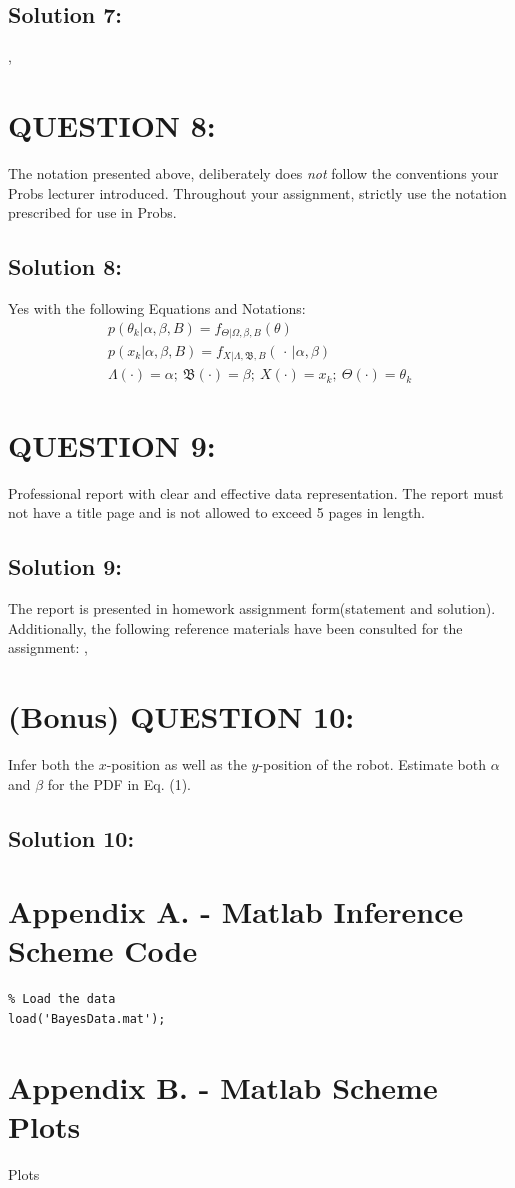 \documentclass[a4paper,11pt]{article}
\begin{document}
\subsection{Solution 7:}
,

\section{QUESTION 8:}
The notation presented above, deliberately does \emph{not} follow the conventions your Probs
lecturer introduced. Throughout your assignment, strictly use the notation prescribed for
use in Probs.
\subsection{Solution 8:}
\label{sec:notation}
Yes with the following Equations and Notations: 
 	\begin{eqnarray}
		p(\theta_k | \alpha, \beta, B) = f_{\Theta | \Omega, \beta, B}(\theta)\\
		p(x_k |\alpha, \beta, B) = f_{X | \Lambda, \mathfrak{B}, B}(\, \cdot \, | \alpha, \beta)\\
		\Lambda (\cdot) = \alpha;\: \mathfrak{B}(\cdot) = \beta ; \: X(\cdot) = x_k; \: \Theta ( \cdot) = \theta_k 
	\end{eqnarray}

\section{QUESTION 9:}
Professional report with clear and effective data representation. The report must not have
a title page and is not allowed to exceed 5 pages in length.
\subsection{Solution 9:}
The report is presented in homework assignment form(statement and solution). Additionally, the following reference materials have been consulted for the assignment: \cite{leon2017probability}, \cite{bishop2006pattern}

\section{(Bonus) QUESTION 10:}
Infer both the $x$-position as well as the $y$-position of the robot. Estimate both $\alpha$ and $\beta$ for the PDF in Eq. (1).
\subsection*{Solution 10:}






\newpage
\appendix

\makeatother
\section{Appendix A. - Matlab Inference Scheme Code}
\begin{lstlisting}
% Load the data
load('BayesData.mat');
\end{lstlisting}

\newpage
\section{Appendix B. - Matlab Scheme Plots}
	Plots
\end{document}
